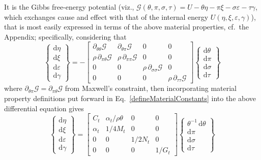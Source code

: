 It is the Gibbs free-energy potential (viz., $\mathcal{G} ( \theta , \pi , \sigma , \tau ) = U - \theta \eta - \pi \xi - \sigma \varepsilon - \tau \gamma$, which exchanges cause and effect with that of the internal energy $U ( \eta , \xi , \varepsilon , \gamma )$), that is most easily expressed in terms of the above material properties, cf.\ the Appendix; specifically, considering that
\begin{displaymath}
\left\{ \begin{matrix}
\mathrm{d}\eta \\ \mathrm{d} \xi \\
\mathrm{d} \varepsilon \\ \mathrm{d} \gamma
\end{matrix} \right\} = -\begin{bmatrix}
\partial_{\theta\theta} \mathcal{G} & 
\partial_{\theta\pi} \mathcal{G} & 0 & 0 \\ 
\rho \, \partial_{\pi\theta} \mathcal{G} & 
\rho \, \partial_{\pi\pi} \mathcal{G} & 0 & 0 \\
0 & 0 & \rho \, \partial_{\sigma\sigma} \mathcal{G} & 0 \\
0 & 0 & 0 & \rho \, \partial_{\tau\tau} \mathcal{G}
\end{bmatrix} 
\left\{ \begin{matrix}
\mathrm{d} \theta \\ \mathrm{d} \pi \\
\mathrm{d} \sigma \\ \mathrm{d} \tau
\end{matrix} \right\} 
\end{displaymath}
where $\partial_{\theta\pi} \mathcal{G} = \partial_{\pi\theta} \mathcal{G}$ from Maxwell's constraint, then incorporating material property definitions put forward in Eq.~\ref{defineMaterialConstants} into the above differential equation gives
\begin{displaymath}
\label{GibbsMembrane}
\left\{ \begin{matrix}
\mathrm{d}\eta \\ \mathrm{d} \xi \\
\mathrm{d} \varepsilon \\ \mathrm{d} \gamma
\end{matrix} \right\} = \begin{bmatrix}
C_t & \alpha_t / \rho \theta & 0 & 0 \\ 
\alpha_t & 1 / 4 M_t & 0 & 0 \\
0 & 0 & 1 / 2 N_t & 0 \\
0 & 0 & 0 & 1 / G_t
\end{bmatrix} 
\left\{ \begin{matrix}
\theta^{-1} \, \mathrm{d} \theta \\ \mathrm{d} \pi \\
\mathrm{d} \sigma \\ \mathrm{d} \tau
\end{matrix} \right\} 
\end{displaymath}
